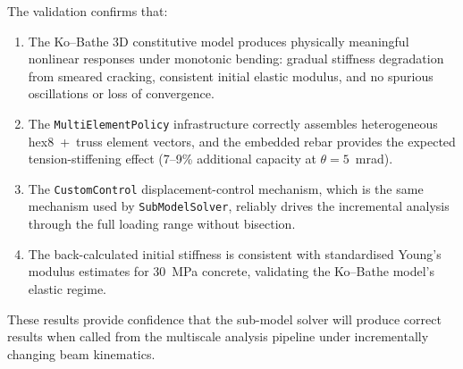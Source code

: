 The validation confirms that:

\begin{enumerate}
  \item The Ko--Bathe 3D constitutive model produces physically meaningful
        nonlinear responses under monotonic bending: gradual stiffness
        degradation from smeared cracking, consistent initial elastic
        modulus, and no spurious oscillations or loss of convergence.

  \item The \texttt{MultiElementPolicy} infrastructure correctly assembles
        heterogeneous hex8~+~truss element vectors, and the embedded
        rebar provides the expected tension-stiffening effect (7--9\%
        additional capacity at $\theta = 5$~mrad).

  \item The \texttt{CustomControl} displacement-control mechanism, which
        is the same mechanism used by \texttt{SubModelSolver}, reliably
        drives the incremental analysis through the full loading range
        without bisection.

  \item The back-calculated initial stiffness is consistent with
        standardised Young's modulus estimates for 30~MPa concrete,
        validating the Ko--Bathe model's elastic regime.
\end{enumerate}

These results provide confidence that the sub-model solver will produce
correct results when called from the multiscale analysis pipeline under
incrementally changing beam kinematics.
